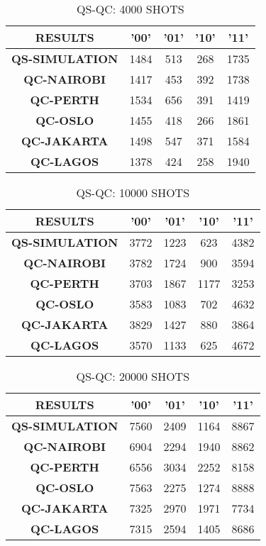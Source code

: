 \begin{table}[!ht]
    \centering
    \begin{tabular}{ccccc}
    \hline
        \textbf{RESULTS} & \textbf{'00'} & \textbf{'01'} & \textbf{'10'} & \textbf{'11' } \\ \hline
        \textbf{QS-SIMULATION} & 1484 & 513 & 268 & 1735  \\ 
        \textbf{QC-NAIROBI} & 1417 & 453 & 392 & 1738  \\ 
        \textbf{QC-PERTH} & 1534 & 656 & 391 & 1419  \\ 
        \textbf{QC-OSLO} & 1455 & 418 & 266 & 1861  \\ 
        \textbf{QC-JAKARTA} & 1498 & 547 & 371 & 1584  \\ 
        \textbf{QC-LAGOS} & 1378 & 424 & 258 & 1940 \\ \hline
    \end{tabular}
    \caption{QS-QC: 4000 SHOTS}
\end{table}

\begin{table}[!ht]
    \centering
    \begin{tabular}{ccccc}
    \hline
        \textbf{RESULTS} & \textbf{'00'} & \textbf{'01'} & \textbf{'10'} & \textbf{'11' } \\ \hline
        \textbf{QS-SIMULATION} & 3772 & 1223 & 623 & 4382  \\ 
        \textbf{QC-NAIROBI} & 3782 & 1724 & 900 & 3594  \\ 
        \textbf{QC-PERTH} & 3703 & 1867 & 1177 & 3253  \\ 
        \textbf{QC-OSLO} & 3583 & 1083 & 702 & 4632  \\ 
        \textbf{QC-JAKARTA} & 3829 & 1427 & 880 & 3864  \\ 
        \textbf{QC-LAGOS} & 3570 & 1133 & 625 & 4672 \\ \hline
    \end{tabular}
    \caption{QS-QC: 10000 SHOTS}
\end{table}

\begin{table}[!ht]
    \centering
    \begin{tabular}{ccccc}
    \hline
        \textbf{RESULTS} & \textbf{'00'} & \textbf{'01'} & \textbf{'10'} & \textbf{'11' } \\ \hline
        \textbf{QS-SIMULATION} & 7560 & 2409 & 1164 & 8867  \\ 
        \textbf{QC-NAIROBI} & 6904 & 2294 & 1940 & 8862  \\ 
        \textbf{QC-PERTH} & 6556 & 3034 & 2252 & 8158  \\ 
        \textbf{QC-OSLO} & 7563 & 2275 & 1274 & 8888  \\ 
        \textbf{QC-JAKARTA} & 7325 & 2970 & 1971 & 7734  \\ 
        \textbf{QC-LAGOS} & 7315 & 2594 & 1405 & 8686 \\ \hline
    \end{tabular}
    \caption{QS-QC: 20000 SHOTS}
\end{table}

